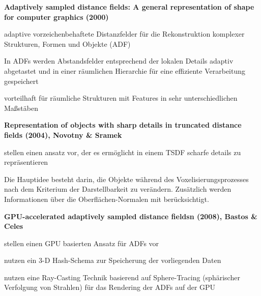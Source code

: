 
\textbf{Adaptively sampled distance fields: A general representation of shape for computer graphics (2000)} \cite{frisken2000adaptively}

\begin{description}
\item
adaptive vorzeichenbehaftete Distanzfelder für die Rekonstruktion komplexer Strukturen, Formen und Objekte (ADF)
\item
In ADFs werden Abstandsfelder entsprechend der lokalen Details adaptiv abgetastet und in einer räumlichen Hierarchie für eine effiziente Verarbeitung gespeichert
\item
vorteilhaft für räumliche Strukturen mit Features in sehr unterschiedlichen Maßstäben
\end{description}


\textbf{Representation of objects with sharp details in truncated distance fields (2004), Novotny \& Sramek} \cite{novotny2005representation}

\begin{description}
\item
stellen einen ansatz vor, der es ermöglicht in einem TSDF scharfe details zu repräsentieren
\item
Die Hauptidee besteht darin, die Objekte während des Voxelisierungsprozesses nach dem Kriterium der Darstellbarkeit zu verändern. Zusätzlich werden Informationen über die Oberflächen-Normalen mit berücksichtigt.
\end{description}


\textbf{GPU-accelerated adaptively sampled distance fieldsn (2008), Bastos \& Celes} \cite{bastos2008gpu}

\begin{description}
\item
stellen einen GPU basierten Ansatz für ADFs vor
\item
nutzen ein 3-D Hash-Schema zur Speicherung der vorliegenden Daten
\item
nutzen eine Ray-Casting Technik basierend auf Sphere-Tracing (sphärischer Verfolgung von Strahlen) für das Rendering der ADFs auf der GPU
\end{description}


